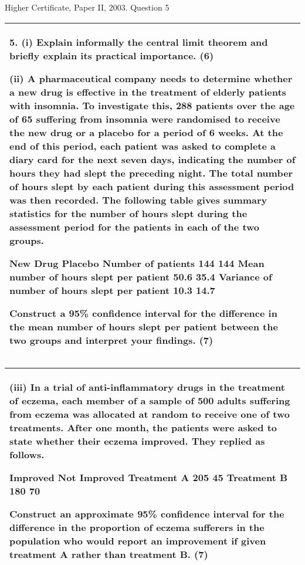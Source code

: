 \documentclass[a4paper,12pt]{article}
\begin{document}
Higher Certificate, Paper II, 2003. Question 5
\begin{table}[ht!]
 
\centering
 
\begin{tabular}{|p{15cm}|}
 
\hline  5. (i) Explain informally the central limit theorem and briefly explain its practical importance. (6) 
 
(ii) A pharmaceutical company needs to determine whether a new drug is effective in the treatment of elderly patients with insomnia.  To investigate this, 288 patients over the age of 65 suffering from insomnia were randomised to receive the new drug or a placebo for a period of 6 weeks.  At the end of this period, each patient was asked to complete a diary card for the next seven days, indicating the number of hours they had slept the preceding night.  The total number of hours slept by each patient during this assessment period was then recorded.  The following table gives summary statistics for the number of hours slept during the assessment period for the patients in each of the two groups. 
 
 New Drug Placebo Number of patients 144 144 Mean number of hours slept per patient 50.6 35.4 Variance of number of hours slept per patient 10.3 14.7 
 
Construct a 95\% confidence interval for the difference in the mean number of hours slept per patient between the two groups and interpret your findings. (7) 
 


\\ \hline
  
\end{tabular}

\end{table}
\begin{table}[ht!]
 
\centering
 
\begin{tabular}{|p{15cm}|}
 
\hline (iii) In a trial of anti-inflammatory drugs in the treatment of eczema, each member of a sample of 500 adults suffering from eczema was allocated at random to receive one of two treatments.  After one month, the patients were asked to state whether their eczema improved.  They replied as follows. 
 
 Improved Not Improved Treatment A 205 45 Treatment B 180 70 
 
Construct an approximate 95\% confidence interval for the difference in the proportion of eczema sufferers in the population who would report an improvement if given treatment A rather than treatment B. (7) 
 

\\ \hline
  
\end{tabular}

\end{table}
 
\end{document}
